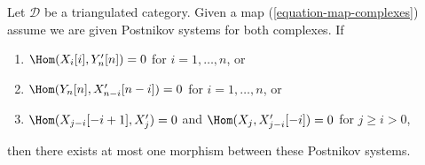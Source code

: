 \begin{lemma}
\label{lemma-uniqueness-maps-postnikov-systems}
Let $\mathcal{D}$ be a triangulated category. Given a map
(\ref{equation-map-complexes}) assume we are given
Postnikov systems for both complexes. If
\begin{enumerate}
\item $\Hom(X_i[i], Y'_n[n]) = 0$ for $i = 1, \ldots, n$, or
\item $\Hom(Y_n[n], X'_{n - i}[n - i]) = 0$ for $i = 1, \ldots, n$, or
\item $\Hom(X_{j - i}[-i + 1], X'_j) = 0$ and
$\Hom(X_j, X'_{j - i}[-i]) = 0$ for $j \geq i > 0$,
\end{enumerate}
then there exists at most one morphism between these Postnikov systems.
\end{lemma}

